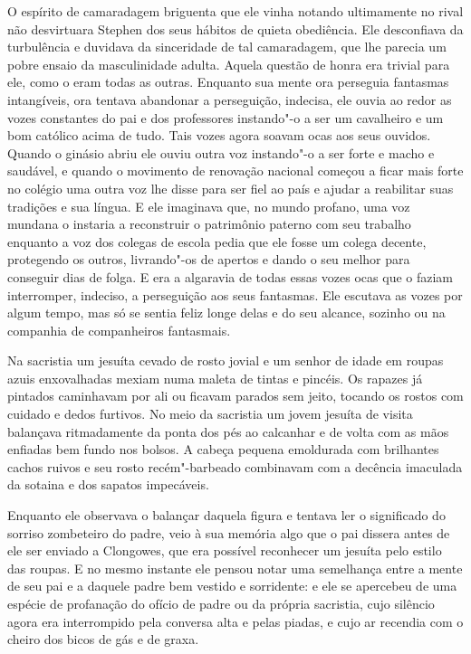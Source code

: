 O espírito de camaradagem briguenta que ele vinha notando ultimamente
no rival não desvirtuara Stephen dos seus hábitos de quieta
obediência. Ele desconfiava da turbulência e duvidava da sinceridade de
tal camaradagem, que lhe parecia um pobre ensaio da masculinidade
adulta. Aquela questão de honra era trivial para ele, como o eram todas
as outras. Enquanto sua mente ora perseguia fantasmas intangíveis, ora
tentava abandonar a perseguição, indecisa, ele ouvia ao redor as vozes
constantes do pai e dos professores instando"-o a ser um cavalheiro e um
bom católico acima de tudo. Tais vozes agora soavam ocas aos seus
ouvidos. Quando o ginásio abriu ele ouviu outra voz instando"-o a ser
forte e macho e saudável, e quando o movimento de renovação nacional
começou a ficar mais forte no colégio uma outra voz lhe disse para ser
fiel ao país e ajudar a reabilitar suas tradições e sua língua. E ele
imaginava que, no mundo profano, uma voz mundana o instaria a
reconstruir o patrimônio paterno com seu trabalho enquanto a voz dos
colegas de escola pedia que ele fosse um colega decente, protegendo os
outros, livrando"-os de apertos e dando o seu melhor para conseguir dias
de folga. E era a algaravia de todas essas vozes ocas que o faziam
interromper, indeciso, a perseguição aos seus fantasmas. Ele escutava
as vozes por algum tempo, mas só se sentia feliz longe delas e do seu
alcance, sozinho ou na companhia de companheiros fantasmais.

Na sacristia um jesuíta cevado de rosto jovial e um senhor de idade em
roupas azuis enxovalhadas mexiam numa maleta de tintas e pincéis. Os
rapazes já pintados caminhavam por ali ou ficavam parados sem jeito,
tocando os rostos com cuidado e dedos furtivos. No meio da sacristia um
jovem jesuíta de visita balançava ritmadamente da ponta dos pés ao
calcanhar e de volta com as mãos enfiadas bem fundo nos bolsos. A
cabeça pequena emoldurada com brilhantes cachos ruivos e seu rosto
recém"-barbeado combinavam com a decência imaculada da sotaina e dos
sapatos impecáveis.

Enquanto ele observava o balançar daquela figura e tentava ler o
significado do sorriso zombeteiro do padre, veio à sua memória algo que
o pai dissera antes de ele ser enviado a Clongowes, que era possível
reconhecer um jesuíta pelo estilo das roupas. E no mesmo instante ele
pensou notar uma semelhança entre a mente de seu pai e a daquele padre
bem vestido e sorridente: e ele se apercebeu de uma espécie de
profanação do ofício de padre ou da própria sacristia, cujo silêncio
agora era interrompido pela conversa alta e pelas piadas, e cujo ar
recendia com o cheiro dos bicos de gás e de graxa.

